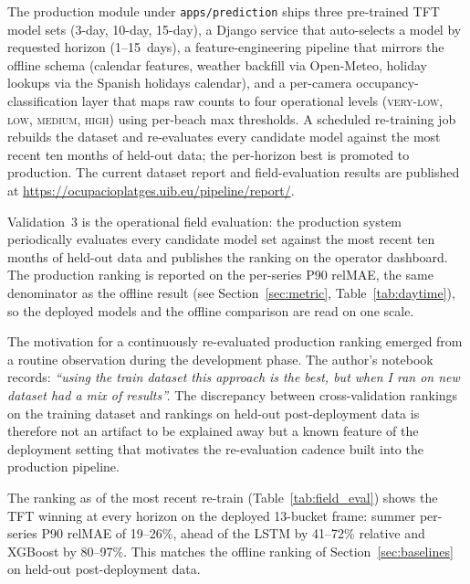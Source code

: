 \documentclass[twocolumn,twoside,a4paper,10pt]{IEEEtran}
\begin{document}
The production module under \texttt{apps/prediction} ships three pre-trained TFT model sets (3-day, 10-day, 15-day), a Django service that auto-selects a model by requested horizon (1--15~days), a feature-engineering pipeline that mirrors the offline schema (calendar features, weather backfill via Open-Meteo, holiday lookups via the Spanish holidays calendar), and a per-camera occupancy-classification layer that maps raw counts to four operational levels (\textsc{very-low}, \textsc{low}, \textsc{medium}, \textsc{high}) using per-beach max thresholds. A scheduled re-training job rebuilds the dataset and re-evaluates every candidate model against the most recent ten months of held-out data; the per-horizon best is promoted to production. The current dataset report and field-evaluation results are published at \url{https://ocupacioplatges.uib.eu/pipeline/report/}.

Validation~3 is the operational field evaluation: the production system periodically evaluates every candidate model set against the most recent ten months of held-out data and publishes the ranking on the operator dashboard. The production ranking is reported on the per-series P90 relMAE, the same denominator as the offline result (see Section~\ref{sec:metric}, Table~\ref{tab:daytime}), so the deployed models and the offline comparison are read on one scale.

The motivation for a continuously re-evaluated production ranking emerged
from a routine observation during the development phase. The author's
notebook records: \emph{``using the train dataset this approach is the best,
but when I ran on new dataset had a mix of results''.} The discrepancy
between cross-validation rankings on the training dataset and rankings on
held-out post-deployment data is therefore not an artifact to be
explained away but a known feature of the deployment setting that motivates
the re-evaluation cadence built into the production pipeline.

The ranking as of the most recent re-train (Table~\ref{tab:field_eval}) shows the TFT winning at every horizon on the deployed 13-bucket frame: summer per-series P90 relMAE of 19--26\%, ahead of the LSTM by 41--72\% relative and XGBoost by 80--97\%. This matches the offline ranking of Section~\ref{sec:baselines} on held-out post-deployment data.
\end{document}
